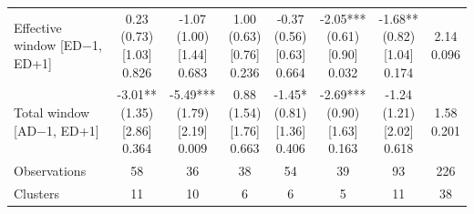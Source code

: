 \begin{threeparttable}
\begin{tabular}{@{}lccccccc}
\addlinespace[0.25ex]
\addlinespace[0.25ex]
Effective window [ED$-$1, ED+1] & \makecell{0.23\\(0.73)\\{}[1.03]\\{0.826}} & \makecell{-1.07\\(1.00)\\{}[1.44]\\{0.683}} & \makecell{1.00\\(0.63)\\{}[0.76]\\{0.236}} & \makecell{-0.37\\(0.56)\\{}[0.63]\\{0.664}} & \makecell{-2.05***\\(0.61)\\{}[0.90]\\{0.032}} & \makecell{-1.68**\\(0.82)\\{}[1.04]\\{0.174}} & \makecell{2.14\\{0.096}} \\
\addlinespace[0.25ex]
\addlinespace[0.25ex]
Total window [AD$-$1, ED+1] & \makecell{-3.01**\\(1.35)\\{}[2.86]\\{0.364}} & \makecell{-5.49***\\(1.79)\\{}[2.19]\\{0.009}} & \makecell{0.88\\(1.54)\\{}[1.76]\\{0.663}} & \makecell{-1.45*\\(0.81)\\{}[1.36]\\{0.406}} & \makecell{-2.69***\\(0.90)\\{}[1.63]\\{0.163}} & \makecell{-1.24\\(1.21)\\{}[2.02]\\{0.618}} & \makecell{1.58\\{0.201}} \\
\addlinespace[0.25ex]
\addlinespace[0.25ex]
Observations & 58 & 36 & 38 & 54 & 39 & 93 & 226 \\
\addlinespace[0.25ex]
\addlinespace[0.25ex]
Clusters & 11 & 10 & 6 & 6 & 5 & 11 & 38 \\

\end{tabular}
\end{threeparttable}

